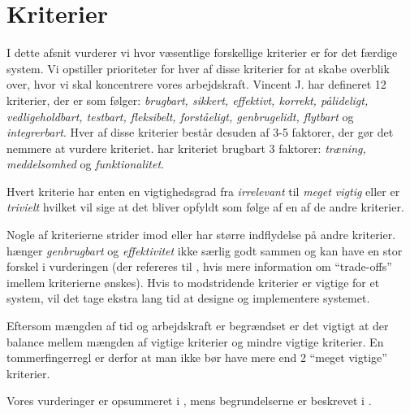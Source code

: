 \section{Kriterier}
\label{sec:kriterier}

I dette afsnit vurderer vi hvor væsentlige forskellige kriterier er for det færdige system. Vi opstiller prioriteter for hver af disse kriterier for at skabe overblik over, hvor vi skal koncentrere vores arbejdskraft. Vincent J. har defineret 12 kriterier\cite{crit}, der er som følger: \emph{brugbart, sikkert, effektivt, korrekt, pålideligt, vedligeholdbart, testbart, fleksibelt, forståeligt, genbrugelidt, flytbart} og \emph{integrerbart}. Hver af disse kriterier består desuden af 3-5 faktorer, der gør det nemmere at vurdere kriteriet. \Fx har kriteriet brugbart 3 faktorer: \emph{træning, meddelsomhed} og \emph{funktionalitet}.

Hvert kriterie har enten en vigtighedsgrad fra \emph{irrelevant} til \emph{meget vigtig} eller er \emph{trivielt} hvilket vil sige at det bliver opfyldt som følge af en af de andre kriterier.
 
Nogle af kriterierne strider imod eller har større indflydelse på andre kriterier. \Fx hænger \emph{genbrugbart} og \emph{effektivitet} ikke særlig godt sammen og kan have en stor forskel i vurderingen (der refereres til \cite[s.~18]{crit}, hvis mere information om ``trade-offs'' imellem kriterierne ønskes). Hvis to modstridende kriterier er vigtige for et system, vil det tage ekstra lang tid at designe og implementere systemet.

Eftersom mængden af tid og arbejdskraft er begrændset er det vigtigt at der balance mellem mængden af vigtige kriterier og mindre vigtige kriterier. En tommerfingerregl er derfor at man ikke bør have mere end 2 ``meget vigtige'' kriterier.

Vores vurderinger er opsummeret i , mens begrundelserne er beskrevet i .






